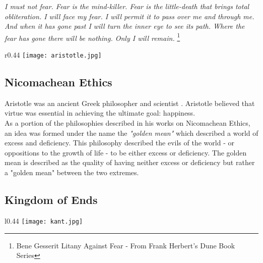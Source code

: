 \documentclass[11pt]{article}
\begin{document}
\begin{center}
\textit{
I must not fear.\linebreak
Fear is the mind-killer.\linebreak
Fear is the little-death that brings total obliteration.\linebreak
I will face my fear.\linebreak
I will permit it to pass over me and through me.\linebreak
And when it has gone past I will turn the inner eye to see its path.\linebreak
Where the fear has gone there will be nothing. \linebreak
Only I will remain.\linebreak
}
\footnote{Bene Gesserit Litany Against Fear - From Frank Herbert's Dune Book Series}
\end{center}

\begin{wrapfigure}[17]{r}{0.44\textwidth}
    \centering
    \texttt{[image: aristotle.jpg]}
\end{wrapfigure}

\subsection{Nicomachean Ethics}

Aristotle was an ancient Greek philosopher and scientist \cite{aristotle}. 
Aristotle believed that virtue was essential in achieving the ultimate goal: happiness.\\ 
\noindent As a portion of the philosophies described in his works on Nicomachean Ethics, an idea was formed under the name the \textit{"golden mean"} which described a world of excess and deficiency.
This philosophy described the evils of the world - or oppositions to the growth of life - to be either excess or deficiency. 
The golden mean is described as the quality of having neither excess or deficiency but rather a "golden mean" between the two extremes. 

\pagebreak
\subsection{Kingdom of Ends}

\begin{wrapfigure}{l}{0.44\textwidth}
    \centering
    \texttt{[image: kant.jpg]}
\end{wrapfigure}
\end{document}
